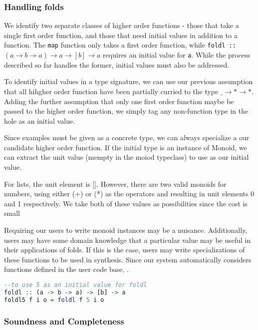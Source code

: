 \subsubsection{Handling folds}
We identify two separate classes of higher order functions - those that take a single first order function, and those that need initial values in addition to a function. The \texttt{map} function only takes a first order function, while \texttt{foldl :: $(a\to b\to a)\to a\to [b]\to a$} requires an initial value for \texttt{a}. While the process described so far handles the former, initial values must also be addressed.

To identify initial values in a type signature, we can use our previous assumption that all hihgher order function have been partially curried to the type \texttt{$\_\to *\to*$}. Adding the further assumption that only one first order function maybe be passed to the higher order function, we simply tag any non-function type in the hole as an initial value. 

Since examples must be given as a concrete type, we can always specialize a our candidate higher order function. If the initial type is an instance of Monoid, we can extract the unit value (mempty in the moiod typeclass) to use as our initial value. 

For lists, the unit element is []. However, there are two valid monoids for numbers, using either (+) or (*) as the operators and resulting in unit elements 0 and 1 respectively. We take both of these values as possibilities since the cost is small 

Requiring our users to write monoid instances may be a nuisance. Additionally, users may have some domain knowledge that a particular value may be useful in their applications of folds. If this is the case, users may write specializations of these functions to be used in synthesis. Since our system automatically considers functions defined in the user code base, .

\begin{lstlisting}[language=haskell]
--to use 5 as an initial value for foldl
foldl :: (a -> b -> a) -> [b] -> a
foldl5 f i o = foldl f 5 i o
\end{lstlisting}


\subsubsection{Soundness and Completeness}\label{sound}

